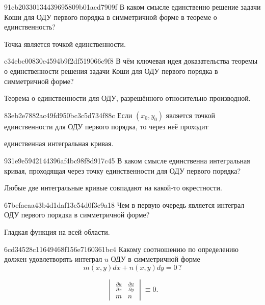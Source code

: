 \begin{note}{91cb20330134439695809b01acd7909f}
    В каком смысле единственно решение задачи Коши для ОДУ первого порядка в симметричной форме в теореме о единственность?

    \begin{cloze}{1}
        Точка является точкой единственности.
    \end{cloze}
\end{note}

\begin{note}{c34ebe00830e4594b9f2df519066c9f8}
    В чём ключевая идея доказательства теоремы о единственности решения задачи Коши для ОДУ первого порядка в симметричной форме?

    \begin{cloze}{1}
        Теорема о единственности для ОДУ, разрешённого относительно производной.
    \end{cloze}
\end{note}

\begin{note}{83eb2e7882ac49fd950bc3c5d734f88c}
    Если \({ (x_0, y_0) }\) является точкой единственности для ОДУ первого порядка, то через неё проходит \begin{icloze}{1}единственная интегральная кривая.\end{icloze}
\end{note}

\begin{note}{931e9e5942144396af4bc98f8d917c45}
    В каком смысле единственна интегральная кривая, проходящая через точку единственности для ОДУ первого порядка?

    \begin{cloze}{1}
        Любые две интегральные кривые совпадают на какой-то окрестности.
    \end{cloze}
\end{note}

\begin{note}{67befaeaa43b4d1daf13c54d0f3c9a18}
    Чем в первую очередь является интеграл ОДУ первого порядка в симметричной форме?

    \begin{cloze}{1}
        Гладкая функция на всей области.
    \end{cloze}
\end{note}

\begin{note}{6cd34528c11649468f156e7160361bc4}
    Какому соотношению по определению должен удовлетворять интеграл \({ u }\) ОДУ в симметричной форме
    \[
        m(x, y) dx + n(x, y) dy = 0\,?
    \]

    \begin{cloze}{1}
        \[
            \begin{vmatrix}
                \frac{\partial u}{\partial x} & \frac{\partial u}{\partial y} \\
                m & n
            \end{vmatrix}
            \equiv 0.
        \]
    \end{cloze}
\end{note}

